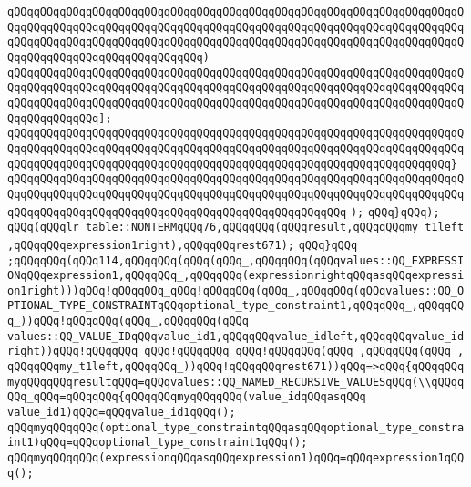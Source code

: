 \verb|qQQqqQQqqQQqqQQqqQQqqQQqqQQqqQQqqQQqqQQqqQQqqQQqqQQqqQQqqQQqqQQqqQQqqQQqqQQqqQQqqQQqqQQqqQQqqQQqqQQqqQQqqQQqqQQqqQQqqQQqqQQqqQQqqQQqqQQqqQQqqQQqqQQqqQQqqQQqqQQqqQQqqQQqqQQqqQQqqQQqqQQqqQQqqQQqqQQqqQQqqQQqqQQqqQQqqQQqqQQqqQQqqQQqqQQqqQQqqQQq)|\newline
\verb|qQQqqQQqqQQqqQQqqQQqqQQqqQQqqQQqqQQqqQQqqQQqqQQqqQQqqQQqqQQqqQQqqQQqqQQqqQQqqQQqqQQqqQQqqQQqqQQqqQQqqQQqqQQqqQQqqQQqqQQqqQQqqQQqqQQqqQQqqQQqqQQqqQQqqQQqqQQqqQQqqQQqqQQqqQQqqQQqqQQqqQQqqQQqqQQqqQQqqQQqqQQqqQQqqQQqqQQqqQQqqQQq];|\newline
\verb|qQQqqQQqqQQqqQQqqQQqqQQqqQQqqQQqqQQqqQQqqQQqqQQqqQQqqQQqqQQqqQQqqQQqqQQqqQQqqQQqqQQqqQQqqQQqqQQqqQQqqQQqqQQqqQQqqQQqqQQqqQQqqQQqqQQqqQQqqQQqqQQqqQQqqQQqqQQqqQQqqQQqqQQqqQQqqQQqqQQqqQQqqQQqqQQqqQQqqQQqqQQqqQQq}|\newline
\verb|qQQqqQQqqQQqqQQqqQQqqQQqqQQqqQQqqQQqqQQqqQQqqQQqqQQqqQQqqQQqqQQqqQQqqQQqqQQqqQQqqQQqqQQqqQQqqQQqqQQqqQQqqQQqqQQqqQQqqQQqqQQqqQQqqQQqqQQqqQQqqQQqqQQqqQQqqQQqqQQqqQQqqQQqqQQqqQQqqQQqqQQqqQQqqQQq|\newline
\verb|);|\newline
\verb|qQQq}qQQq);|\newline
\verb|qQQq(qQQqlr_table::NONTERMqQQq76,qQQqqQQq(qQQqresult,qQQqqQQqmy_t1left,qQQqqQQqexpression1right),qQQqqQQqrest671);|\newline
\verb|qQQq}qQQq|\newline
\verb|;qQQqqQQq(qQQq114,qQQqqQQq(qQQq(qQQq_,qQQqqQQq(qQQqvalues::QQ_EXPRESSIONqQQqexpression1,qQQqqQQq_,qQQqqQQq(expressionrightqQQqasqQQqexpression1right)))qQQq!qQQqqQQq_qQQq!qQQqqQQq(qQQq_,qQQqqQQq(qQQqvalues::QQ_OPTIONAL_TYPE_CONSTRAINTqQQqoptional_type_constraint1,qQQqqQQq_,qQQqqQQq_))qQQq!qQQqqQQq(qQQq_,qQQqqQQq(qQQq|\newline
\verb|values::QQ_VALUE_IDqQQqvalue_id1,qQQqqQQqvalue_idleft,qQQqqQQqvalue_idright))qQQq!qQQqqQQq_qQQq!qQQqqQQq_qQQq!qQQqqQQq(qQQq_,qQQqqQQq(qQQq_,qQQqqQQqmy_t1left,qQQqqQQq_))qQQq!qQQqqQQqrest671))qQQq=>qQQq{qQQqqQQqmyqQQqqQQqresultqQQq=qQQqvalues::QQ_NAMED_RECURSIVE_VALUESqQQq(\\qQQqqQQq_qQQq=qQQqqQQq{qQQqqQQqmyqQQqqQQq(value_idqQQqasqQQq|\newline
\verb|value_id1)qQQq=qQQqvalue_id1qQQq();|\newline
\verb|qQQqmyqQQqqQQq(optional_type_constraintqQQqasqQQqoptional_type_constraint1)qQQq=qQQqoptional_type_constraint1qQQq();|\newline
\verb|qQQqmyqQQqqQQq(expressionqQQqasqQQqexpression1)qQQq=qQQqexpression1qQQq();|\newline
